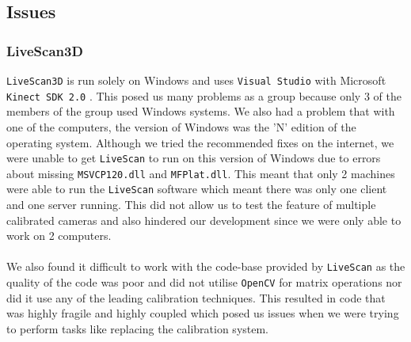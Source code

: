 \documentclass{article}
\begin{document}
\newpage
\subsection{Issues}
\subsubsection{LiveScan3D}
\texttt{LiveScan3D} \cite{livescan} is run solely on Windows and uses \texttt{Visual Studio} \cite{vs} with Microsoft \texttt{Kinect SDK 2.0} \cite{kinect}. This posed us many problems as a group because only 3 of the members of the group used Windows systems. We also had a problem that with one of the computers, the version of Windows was the 'N' edition of the operating system. Although we tried the recommended fixes on the internet, we were unable to get \texttt{LiveScan} to run on this version of Windows due to errors about missing \texttt{MSVCP120.dll} and \texttt{MFPlat.dll}. This meant that only 2 machines were able to run the \texttt{LiveScan} software which meant there was only one client and one server running. This did not allow us to test the feature of multiple calibrated cameras and also hindered our development since we were only able to work on 2  computers.
\\\\
We also found it difficult to work with the code-base provided by \texttt{LiveScan} as the quality of the code was poor and did not utilise \texttt{OpenCV} \cite{opencv} for matrix operations nor did it use any of the leading calibration techniques. This resulted in code that was highly fragile and highly coupled which posed us issues when we were trying to perform tasks like replacing the calibration system.
\end{document}
